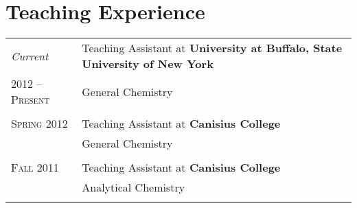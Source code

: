 \documentclass[letterpaper,10pt]{article} %
\begin{document}

\section{Teaching Experience}
\noindent 
\begin{tabular}{R{3cm}|p{13cm}} 

\emph{Current} & Teaching Assistant at \textbf{University at Buffalo, State University of New York}\\
\textsc{2012 -- Present} & \small General Chemistry\\
 \\


\textsc{Spring 2012} & Teaching Assistant at \textbf{Canisius College}\\
& \small General Chemistry\\
 \\


\textsc{Fall 2011} & Teaching Assistant at \textbf{Canisius College}\\
& \small Analytical Chemistry\\
 \\

\end{tabular}



\end{document}
